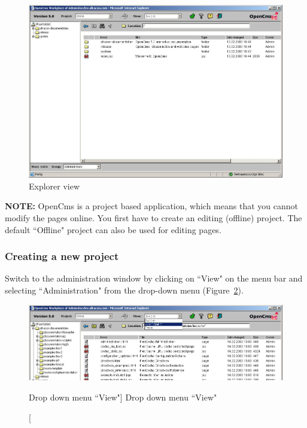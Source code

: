 \begin{figure}[!hbt]
\begin{center}
\includegraphics[width=\sgw]
                   {pics/usermanual/explorer}
\caption[Explorer view]
           {Explorer view}
\label{explorer}
\end{center}
\end{figure}

\textbf{NOTE:} OpenCms is a project based application, which means
that you cannot modify the pages online. You first have to create
an editing (offline) project. The default ``Offline" project can 
also be used for editing pages.

\subsubsection{Creating a new project}

Switch to the administration window by clicking on ``View" on the
menu bar and selecting ``Administration" from the drop-down menu
(Figure~\ref{view}).

\begin{figure}[!hbt]
\begin{center}
\includegraphics[width=\sgw]
                   {pics/usermanual/view}
\caption[Drop down menu ``View"]
           {Drop down menu ``View"}
\label{view}
\end{center}
\end{figure}


